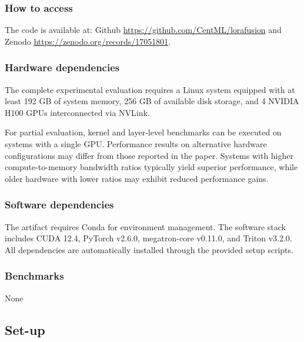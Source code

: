 \subsubsection{How to access}
The code is available at: 
Github \url{https://github.com/CentML/lorafusion} and Zenodo \url{https://zenodo.org/records/17051801}.

\subsubsection{Hardware dependencies}
The complete experimental evaluation requires a Linux system equipped with at least 192 GB of system memory, 256 GB of available disk storage, and 4 NVIDIA H100 GPUs interconnected via NVLink.

For partial evaluation, kernel and layer-level benchmarks can be executed on systems with a single GPU. Performance results on alternative hardware configurations may differ from those reported in the paper. Systems with higher compute-to-memory bandwidth ratios typically yield superior performance, while older hardware with lower ratios may exhibit reduced performance gains.

\subsubsection{Software dependencies}
The artifact requires Conda for environment management. The software stack includes CUDA 12.4, PyTorch v2.6.0, megatron-core v0.11.0, and Triton v3.2.0. All dependencies are automatically installed through the provided setup scripts.

\subsubsection{Benchmarks} 
None

\subsection{Set-up}

